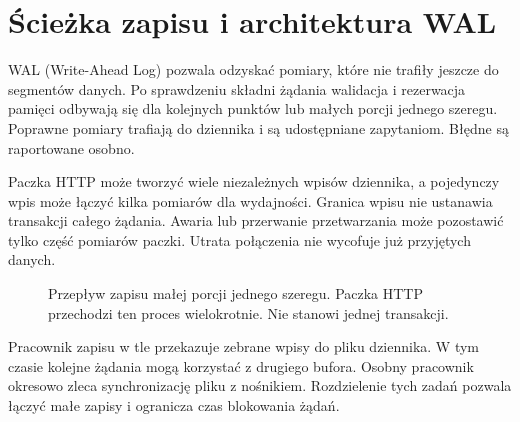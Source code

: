 \documentclass[11pt,a4paper]{article}
\begin{document}
\section{Ścieżka zapisu i architektura WAL}
\label{sec:write}
\label{sec:wal-runtime}
WAL (Write-Ahead Log) pozwala odzyskać pomiary, które nie trafiły
jeszcze do segmentów danych. Po sprawdzeniu składni żądania walidacja
i rezerwacja pamięci odbywają się dla kolejnych punktów lub małych porcji
jednego szeregu. Poprawne pomiary trafiają do dziennika i są udostępniane
zapytaniom. Błędne są raportowane osobno.

Paczka HTTP może tworzyć wiele niezależnych wpisów dziennika, a pojedynczy
wpis może łączyć kilka pomiarów dla wydajności. Granica wpisu nie ustanawia
transakcji całego żądania. Awaria lub przerwanie przetwarzania może
pozostawić tylko część pomiarów paczki. Utrata połączenia nie wycofuje
już przyjętych danych.

\begin{figure}[!htbp]
  \centering
  \caption{Przepływ zapisu małej porcji jednego szeregu. Paczka HTTP przechodzi
    ten proces wielokrotnie. Nie stanowi jednej transakcji.}
  \label{fig:write-sequence}
\end{figure}

Pracownik zapisu w tle przekazuje zebrane wpisy do pliku dziennika.
W tym czasie kolejne żądania mogą korzystać z drugiego bufora.
Osobny pracownik okresowo zleca synchronizację pliku z nośnikiem.
Rozdzielenie tych zadań pozwala łączyć małe zapisy i ogranicza czas
blokowania żądań.
\end{document}
